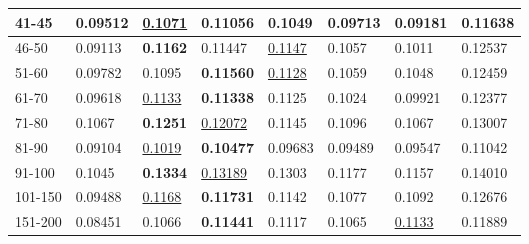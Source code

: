 \begin{table*}[]
\begin{tabular}{|l|l|l|l|l|l|l||l|}
        41-45   & 0.09512                        & \underline{0.1071}             & \textbf{0.11056}               & 0.1049                         & 0.09713                        & 0.09181                         & 0.11638                    \\ \hline
        46-50   & 0.09113                        & \textbf{0.1162}                & 0.11447                        & \underline{0.1147}             & 0.1057                         & 0.1011                          & 0.12537                    \\ \hline
        51-60   & 0.09782                        & 0.1095                         & \textbf{0.11560}               & \underline{0.1128}             & 0.1059                         & 0.1048                          & 0.12459                    \\ \hline
        61-70   & 0.09618                        & \underline{0.1133}             & \textbf{0.11338}               & 0.1125                         & 0.1024                         & 0.09921                         & 0.12377                    \\ \hline
        71-80   & 0.1067                         & \textbf{0.1251}                & \underline{0.12072}            & 0.1145                         & 0.1096                         & 0.1067                          & 0.13007                    \\ \hline
        81-90   & 0.09104                        & \underline{0.1019}             & \textbf{0.10477}               & 0.09683                        & 0.09489                        & 0.09547                         & 0.11042                    \\ \hline
        91-100  & 0.1045                         & \textbf{0.1334}                & \underline{0.13189}            & 0.1303                         & 0.1177                         & 0.1157                          & 0.14010                    \\ \hline
        101-150 & 0.09488                        & \underline{0.1168}             & \textbf{0.11731}               & 0.1142                         & 0.1077                         & 0.1092                          & 0.12676                    \\ \hline
        151-200 & 0.08451                        & 0.1066                         & \textbf{0.11441}               & 0.1117                         & 0.1065                         & \underline{0.1133}              & 0.11889                    \\ \hline

\end{tabular}
\end{table*}
